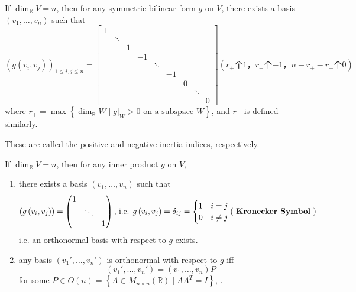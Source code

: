 \begin{theorem}
    If $\dim_{\mathbb{R}}V=n$, then for any symmetric bilinear form $g$ on $V$, there exists a basis $\left(v_1,\dots,v_n\right)$ such that
    $$
        \left(g\left(v_i,v_j\right)\right)_{1\leq i,j\leq n}=
        \begin{bmatrix}
            1 &        &   &    &        &    &   &        &   \\
              & \ddots &   &    &        &    &   &        &   \\
              &        & 1 &    &        &    &   &        &   \\
              &        &   & -1 &        &    &   &        &   \\
              &        &   &    & \ddots &    &   &        &   \\
              &        &   &    &        & -1 &   &        &   \\
              &        &   &    &        &    & 0 &        &   \\
              &        &   &    &        &    &   & \ddots &   \\
              &        &   &    &        &    &   &        & 0
        \end{bmatrix}(\text{$r_+$个$1$，$r_-$个$-1$，$n-r_+-r_-$个$0$})
    $$
    where $r_+=\max\left\{\dim_{\mathbb{R}}W\mid g|_W>0\text{ on a subspace }W\right\}$, and $r_-$ is defined similarly.

    These are called the positive and negative inertia indices, respectively.
\end{theorem}

\begin{theorem}
    If $\dim_{\mathbb{R}}V=n$, then for any inner product $g$ on $V$,
    \begin{enumerate}
        \item there exists a basis $\left(v_1,\dots,v_n\right)$ such that
              $$\left(g\left(v_i,v_j\right)\right)=\begin{pmatrix}
                      1 &  & \\&\ddots&\\&&1
                  \end{pmatrix},\,\text{i.e. }g\left(v_i,v_j\right)=\delta_{ij}=\begin{cases}
                      1 & i=j \\0&i\neq j
                  \end{cases}(\text{ \textbf{\boldmath Kronecker Symbol} })$$
              i.e. an orthonormal basis with respect to $g$ exists.
        \item any basis $\left(v_1',\dots,v_n'\right)$ is orthonormal with respect to $g$ iff
              $$\left(v_1',\dots,v_n'\right)=\left(v_1,\dots,v_n\right)P$$
              for some $P\in O(n)=\left\{A\in M_{n\times n}(\mathbb{R})\mid AA^T=I\right\}$, .
    \end{enumerate}
\end{theorem}

